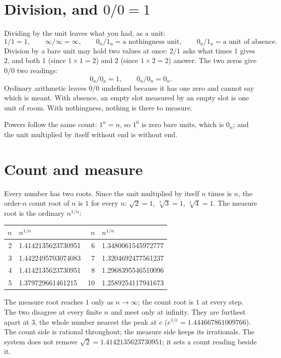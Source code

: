 \documentclass[11pt]{article}
\begin{document}
\section{Division, and $0/0 = 1$}
Dividing by the unit leaves what you had, as a unit:
\[ 1/1 = 1,\qquad \infty/\infty = \infty,\qquad 0_n/1_u = \text{a nothingness unit},\qquad 0_a/1_u = \text{a unit of absence}. \]
Division by a bare unit may hold two values at once: $2/1$ asks what times $1$ gives $2$, and both $1$ (since $1\times1 = 2$) and $2$ (since $1\times2 = 2$) answer. The two zeros give $0/0$ two readings:
\[ 0_a/0_a = 1,\qquad 0_n/0_n = 0_n. \]
Ordinary arithmetic leaves $0/0$ undefined because it has one zero and cannot say which is meant. With absence, an empty slot measured by an empty slot is one unit of room. With nothingness, nothing is there to measure.

Powers follow the same count: $1^n = n$, so $1^0$ is zero bare units, which is $0_n$; and the unit multiplied by itself without end is without end.

\section{Count and measure}
Every number has two roots. Since the unit multiplied by itself $n$ times is $n$, the order-$n$ count root of $n$ is $1$ for every $n$: $\sqrt2 = 1$, $\sqrt[3]3 = 1$, $\sqrt[4]4 = 1$. The measure root is the ordinary $n^{1/n}$:
\begin{center}\begin{tabular}{rl@{\qquad}rl}\toprule
$n$ & $n^{1/n}$ & $n$ & $n^{1/n}$\\\midrule
2 & 1.4142135623730951 & 6 & 1.3480061545972777\\
3 & 1.4422495703074083 & 7 & 1.3204692477561237\\
4 & 1.4142135623730951 & 8 & 1.2968395546510096\\
5 & 1.379729661461215 & 10 & 1.2589254117941673\\\bottomrule
\end{tabular}\end{center}
The measure root reaches $1$ only as $n\to\infty$; the count root is $1$ at every step. The two disagree at every finite $n$ and meet only at infinity. They are furthest apart at $3$, the whole number nearest the peak at $e$ ($e^{1/e} = 1.444667861009766$). The count side is rational throughout; the measure side keeps its irrationals. The system does not remove $\sqrt2 = 1.4142135623730951$; it sets a count reading beside it.
\end{document}
